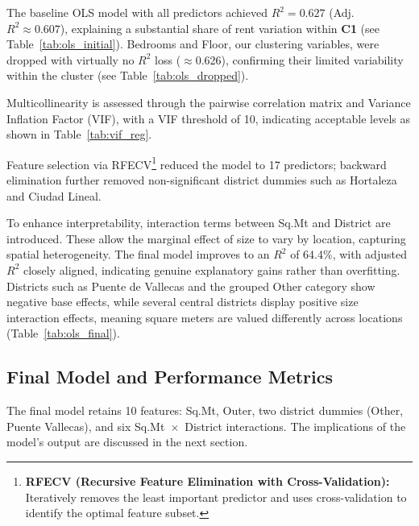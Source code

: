 \documentclass[10pt,a4paper,twocolumn]{article}
\newcommand{\cluster}[1]{\textbf{C#1}}
\begin{document}
The baseline OLS model with all predictors achieved $R^2\!=\!0.627$ (Adj.\ $R^2\!\approx\!0.607$), explaining a substantial share of rent variation within \cluster{1} (see Table~\ref{tab:ols_initial}). Bedrooms and Floor, our clustering variables, were dropped with virtually no $R^2$ loss ($\approx$0.626), confirming their limited variability within the cluster (see Table~\ref{tab:ols_dropped}).

Multicollinearity is assessed through the pairwise correlation matrix and Variance Inflation Factor (VIF), with a VIF threshold of 10, indicating acceptable levels as shown in Table~\ref{tab:vif_reg}.

Feature selection via RFECV\footnote{\textbf{RFECV (Recursive Feature Elimination with Cross-Validation):} Iteratively removes the least important predictor and uses cross-validation to identify the optimal feature subset.} reduced the model to 17 predictors; backward elimination further removed non-significant district dummies such as Hortaleza and Ciudad Lineal.

To enhance interpretability, interaction terms between Sq.Mt and District are introduced. These allow the marginal effect of size to vary by location, capturing spatial heterogeneity. The final model improves to an $R^2$ of 64.4\%, with adjusted $R^2$ closely aligned, indicating genuine explanatory gains rather than overfitting. Districts such as Puente de Vallecas and the grouped Other category show negative base effects, while several central districts display positive size interaction effects, meaning square meters are valued differently across locations (Table~\ref{tab:ols_final}).
 
\subsection{Final Model and Performance Metrics}

The final model retains 10 features: Sq.Mt, Outer, two district dummies (Other, Puente Vallecas), and six Sq.Mt~$\times$~District interactions. The implications of the model's output are discussed in the next section.
\end{document}

